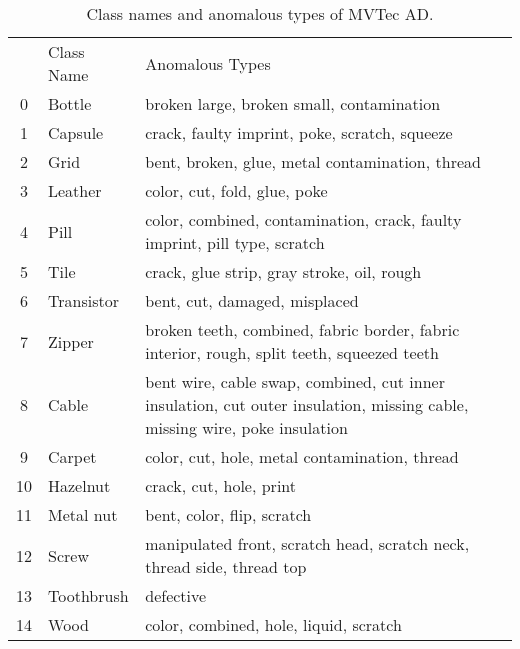 \documentclass[journal]{IEEEtran}
\begin{document}
\renewcommand \arraystretch{0.9}
\begin{table}[!htb]
  \centering
  \caption{Class names and anomalous types of MVTec AD.}
  \footnotesize
  \begin{tabular}{cx{1.4cm}x{5.6cm}}
    \toprule
		 & Class Name & Anomalous Types\\
		\cmidrule(lr){1-1} \cmidrule(lr){2-2} \cmidrule(lr){3-3} 
		0 & Bottle & broken large, broken small, contamination\\
		1 & Capsule & crack, faulty imprint, poke, scratch, squeeze\\
		2 & Grid & bent, broken, glue, metal contamination, thread\\
		3 & Leather & color, cut, fold, glue, poke\\
	    4 & Pill & color, combined, contamination, crack, faulty imprint, pill type, scratch\\
		5 & Tile & crack, glue strip, gray stroke, oil, rough\\
		6 & Transistor & bent, cut, damaged, misplaced\\
		7 & Zipper & broken teeth, combined, fabric border, fabric interior, rough, split teeth, squeezed teeth\\
		8 & Cable & bent wire, cable swap, combined, cut inner insulation, cut outer insulation, missing cable, missing wire, poke insulation\\
		9 & Carpet & color, cut, hole, metal contamination, thread\\
		10 & Hazelnut & crack, cut, hole, print\\
	    11 & Metal nut & bent, color, flip, scratch\\
		12 & Screw & manipulated front, scratch head, scratch neck, thread side, thread top\\
		13 & Toothbrush & defective\\
	    14 & Wood & color, combined, hole, liquid, scratch\\
        \bottomrule
		\end{tabular}
	\label{tal:index2}
\end{table}
\end{document}
